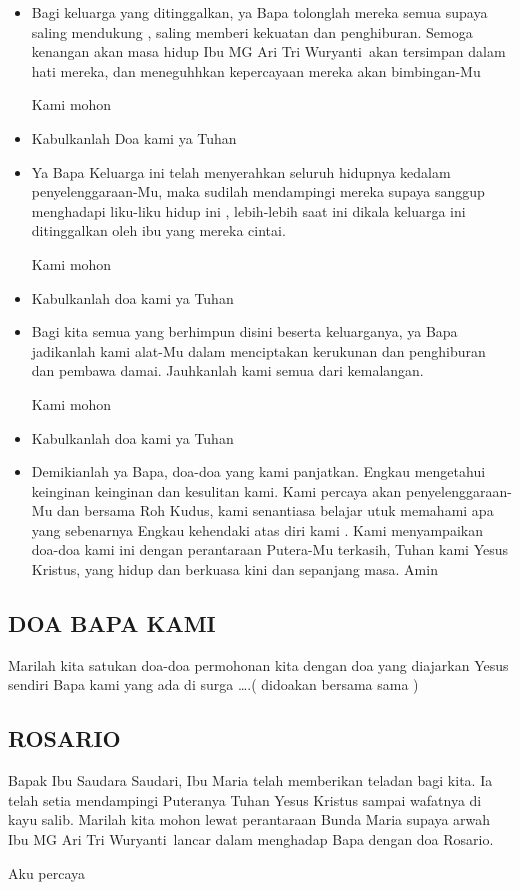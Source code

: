 \documentclass[a5paper,headsepline,titlepage,11pt,nnormalheadings,DIVcalc]{scrbook}
\newcommand{\BU}[1]{\begin{itemize} \item[U:] #1 \end{itemize}}
\newcommand{\BP}[1]{\begin{itemize} \item[P:] #1 \end{itemize}}
\newcommand{\namaalm}{Ibu MG Ari Tri Wuryanti~}
\begin{document}
\BP{Bagi keluarga yang ditinggalkan, ya Bapa tolonglah mereka semua supaya saling mendukung , saling memberi kekuatan dan penghiburan. Semoga kenangan akan masa hidup \namaalm akan tersimpan dalam hati mereka, dan meneguhhkan kepercayaan mereka akan bimbingan-Mu 

Kami mohon}

\BU{Kabulkanlah Doa kami ya Tuhan} 

\BP{Ya Bapa Keluarga ini telah menyerahkan seluruh hidupnya kedalam penyelenggaraan-Mu, maka sudilah mendampingi mereka supaya sanggup menghadapi liku-liku hidup ini , lebih-lebih saat ini dikala keluarga ini ditinggalkan oleh ibu yang mereka cintai.

Kami mohon}

\BU{Kabulkanlah doa kami ya Tuhan}

\BP{Bagi kita semua yang berhimpun disini beserta keluarganya, ya Bapa jadikanlah kami alat-Mu dalam menciptakan kerukunan dan penghiburan dan pembawa damai. Jauhkanlah kami semua dari kemalangan.

Kami mohon}

\BU{Kabulkanlah doa kami ya Tuhan}

\BP{Demikianlah ya Bapa, doa-doa yang kami panjatkan. Engkau mengetahui keinginan keinginan dan kesulitan kami. Kami percaya akan penyelenggaraan-Mu dan bersama Roh Kudus, kami senantiasa belajar utuk memahami apa yang sebenarnya Engkau kehendaki atas diri kami . Kami menyampaikan doa-doa kami ini dengan perantaraan Putera-Mu terkasih, Tuhan kami Yesus Kristus, yang hidup dan berkuasa kini dan sepanjang masa. Amin}


\subsection*{DOA BAPA KAMI}
Marilah kita satukan doa-doa permohonan kita dengan doa yang diajarkan Yesus sendiri 
Bapa kami yang ada di surga \dots .( didoakan bersama sama )

\subsection*{ROSARIO}
Bapak Ibu Saudara Saudari, Ibu Maria telah memberikan teladan bagi kita. Ia telah setia mendampingi Puteranya Tuhan Yesus Kristus sampai wafatnya di kayu salib. Marilah kita mohon lewat perantaraan Bunda Maria supaya arwah \namaalm lancar dalam menghadap Bapa dengan doa Rosario.

Aku percaya
\end{document}
